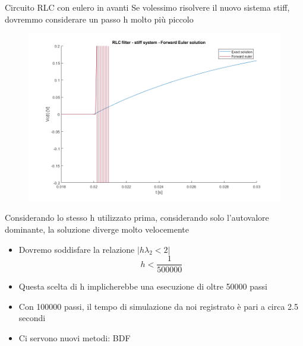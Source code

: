 \documentclass[aspectratio=169, 10pt, handout,usenames,dvipsnames]{beamer}
\begin{document}
\begin{frame}{Circuito RLC con eulero in avanti}
Se volessimo risolvere il nuovo sistema \alert{stiff}, dovremmo considerare un passo h molto più piccolo
\begin{multicols}{2}
        \begin{figure}
        \centering
        \includegraphics[width=1\linewidth]{rlc_forward_euler.png}
        \label{fig:fe_stiff}
        \end{figure}
        \begin{centering}
            Considerando lo stesso h utilizzato prima, considerando solo l'autovalore dominante, la soluzione diverge molto velocemente
        \end{centering}
        \columnbreak
        \begin{itemize}
    \item Dovremo soddisfare la relazione \( | h \lambda_2 < 2 | \) \[h < \dfrac{1}{500000} \]
    \item Questa scelta di h implicherebbe una esecuzione di oltre \alert{50000} passi
    \item Con 100000 passi, il tempo di simulazione da noi registrato è pari a circa 2.5 secondi

\item Ci servono nuovi metodi: BDF

\end{itemize}
\end{multicols}

\end{frame}
\end{document}
